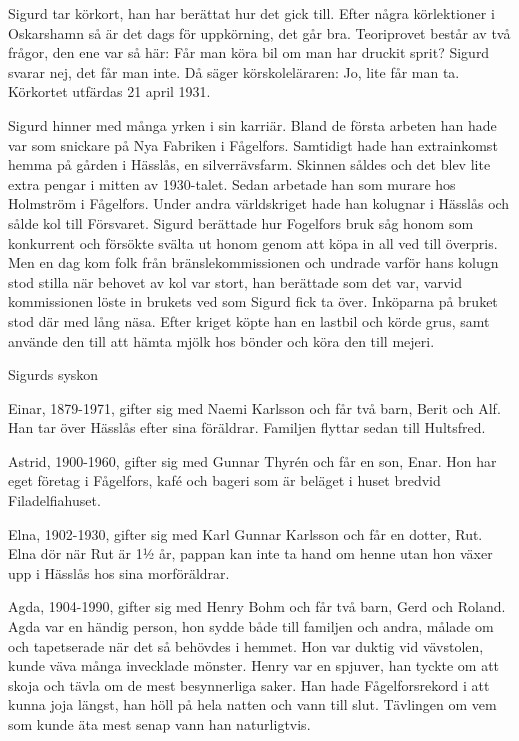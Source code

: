 Sigurd tar körkort, han har berättat hur det gick till. Efter några körlektioner i Oskarshamn så är det dags för uppkörning, det går bra. Teoriprovet består av två frågor, den ene var så här: Får man köra bil om man har druckit sprit? Sigurd svarar nej, det får man inte. Då säger körskoleläraren: Jo, lite får man ta. Körkortet utfärdas 21 april 1931.

Sigurd hinner med många yrken i sin karriär. Bland de första arbeten han hade var som snickare på Nya Fabriken i Fågelfors. Samtidigt hade han extrainkomst hemma på gården i Hässlås, en silverrävsfarm. Skinnen såldes och det blev lite extra pengar i mitten av 1930-talet. Sedan arbetade han som murare hos Holmström i Fågelfors. Under andra världskriget hade han kolugnar i Hässlås och sålde kol till Försvaret. Sigurd berättade hur Fogelfors bruk såg honom som konkurrent och försökte svälta ut honom genom att köpa in all ved till överpris. Men en dag kom folk från bränslekommissionen och undrade varför hans kolugn stod stilla när behovet av kol var stort, han berättade som det var, varvid kommissionen löste in brukets ved som Sigurd fick ta över. Inköparna på bruket stod där med lång näsa. Efter kriget köpte han en lastbil och körde grus, samt använde den till att hämta mjölk hos bönder och köra den till mejeri.

Sigurds syskon

Einar, 1879-1971, gifter sig med Naemi  Karlsson och får två barn, Berit och Alf. Han tar över Hässlås efter sina föräldrar. Familjen flyttar sedan till Hultsfred.

Astrid, 1900-1960, gifter sig med Gunnar Thyrén och får en son, Enar. Hon har eget företag i Fågelfors, kafé och bageri som är beläget i huset bredvid Filadelfiahuset.

Elna, 1902-1930, gifter sig med Karl Gunnar Karlsson och får en dotter, Rut. Elna dör när Rut är 1½ år, pappan kan inte ta hand om henne utan hon växer upp i Hässlås hos sina morföräldrar.

Agda, 1904-1990, gifter sig med Henry Bohm och får två barn, Gerd och Roland. Agda var en händig person, hon sydde både till familjen och andra, målade om och tapetserade när det så behövdes i hemmet. Hon var duktig vid vävstolen, kunde väva många invecklade mönster. Henry var en spjuver, han tyckte om att skoja och tävla om de mest besynnerliga saker. Han hade Fågelforsrekord i att kunna joja längst, han höll på hela natten och vann till slut. Tävlingen om vem som kunde äta mest senap vann han naturligtvis.

